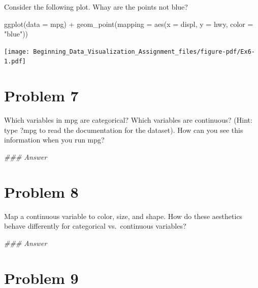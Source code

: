 \documentclass[
  letterpaper,
  DIV=11,
  numbers=noendperiod]{scrreprt}
\newenvironment{Shaded}{\begin{snugshade}}{\end{snugshade}}
\newcommand{\AttributeTok}[1]{\textcolor[rgb]{0.40,0.45,0.13}{#1}}
\newcommand{\DocumentationTok}[1]{\textcolor[rgb]{0.37,0.37,0.37}{\textit{#1}}}
\newcommand{\FunctionTok}[1]{\textcolor[rgb]{0.28,0.35,0.67}{#1}}
\newcommand{\NormalTok}[1]{\textcolor[rgb]{0.00,0.23,0.31}{#1}}
\newcommand{\SpecialCharTok}[1]{\textcolor[rgb]{0.37,0.37,0.37}{#1}}
\newcommand{\StringTok}[1]{\textcolor[rgb]{0.13,0.47,0.30}{#1}}
\begin{document}

Consider the following plot. Whay are the points not blue?

\begin{Shaded}
\begin{Highlighting}[]
\FunctionTok{ggplot}\NormalTok{(}\AttributeTok{data =}\NormalTok{ mpg) }\SpecialCharTok{+} 
  \FunctionTok{geom\_point}\NormalTok{(}\AttributeTok{mapping =} \FunctionTok{aes}\NormalTok{(}\AttributeTok{x =}\NormalTok{ displ, }\AttributeTok{y =}\NormalTok{ hwy, }\AttributeTok{color =} \StringTok{"blue"}\NormalTok{))}
\end{Highlighting}
\end{Shaded}

\texttt{[image: Beginning\_Data\_Visualization\_Assignment\_files/figure-pdf/Ex6-1.pdf]}

\section*{Problem 7}\label{problem-7-1}


Which variables in mpg are categorical? Which variables are continuous?
(Hint: type ?mpg to read the documentation for the dataset). How can you
see this information when you run mpg?

\begin{Shaded}
\begin{Highlighting}[]
\DocumentationTok{\#\#\# Answer}
\end{Highlighting}
\end{Shaded}

\section*{Problem 8}\label{problem-8-1}


Map a continuous variable to color, size, and shape. How do these
aesthetics behave differently for categorical vs.~continuous variables?

\begin{Shaded}
\begin{Highlighting}[]
\DocumentationTok{\#\#\# Answer}
\end{Highlighting}
\end{Shaded}

\section*{Problem 9}\label{problem-9-1}
\end{document}
